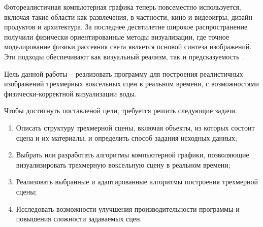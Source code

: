 Фотореалистичная компьютерная графика теперь повсеместно используется, включая такие области как развлечения, в частности, кино и видеоигры, дизайн продуктов и архитектура. За последнее десятилетие широкое распространение получили физически ориентированные методы визуализации, где точное моделирование физики рассеяния света является основой синтеза изображений. Эти подходы обеспечивают как визуальный реализм, так и предсказуемость~\cite{PBRT3e}.

Цель данной работы -- реализовать программу для построения 
реалистичных изображений трехмерных воксельных сцен в реальном времени,
с возможностями физически-корректной визуализации воды.

Чтобы достигнуть поставленой цели, требуется решить следующие задачи.

\begin{enumerate}
    \item Описать структуру трехмерной сцены, включая объекты, из которых
          состоит сцена и их материалы, и определить способ задания 
          исходных данных;
    \item Выбрать или разработать алгоритмы компьютерной 
          графики, позволяющие визуализировать трехмерную воксельную
          сцену в реальном времени;
    \item Реализовать выбранные и адаптированные алгоритмы построения 
          трехмерной сцены;
    \item Исследовать возможности улучшения производительности программы
          и повышения сложности задаваемых сцен.
\end{enumerate}
